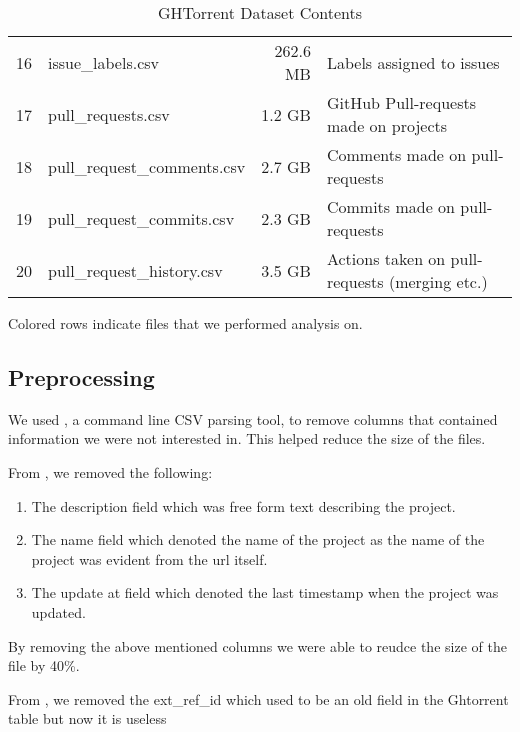 \begin{table}[htb]
\begin{tabular}{@{}llrl@{}}
           16 & issue\_labels.csv           & 262.6 MB & Labels assigned to issues \\
           \rowcolor{LightCyan}
           17 & pull\_requests.csv          & 1.2 GB   & GitHub Pull-requests made on projects \\
           18 & pull\_request\_comments.csv & 2.7 GB   & Comments made on pull-requests \\
           19 & pull\_request\_commits.csv  & 2.3 GB   & Commits made on pull-requests \\
           20 & pull\_request\_history.csv  & 3.5 GB   & Actions taken on pull-requests (merging etc.) \\

        \bottomrule
    \end{tabular}

    \caption{GHTorrent Dataset Contents}
    \small{Colored rows indicate files that we performed analysis on.}
\end{table}

\newpage
\subsection{Preprocessing}

We used , a command line CSV parsing tool, to remove columns that contained information we were not interested in. This helped reduce the size of the files. \\ \linebreak

From , we removed the following:
\begin{enumerate}
    \item The description field which was free form text describing the project.
    \item The name field which denoted the name of the project as the name of the project was evident from the url itself.
    \item The update at field which denoted the last timestamp when the project was updated.
\end{enumerate}
By removing the above mentioned columns we were able to reudce the size of the file by 40\%. \\ \linebreak

From , we removed the ext\_ref\_id which used to be an old field in the Ghtorrent table but now it is useless\\ \linebreak

